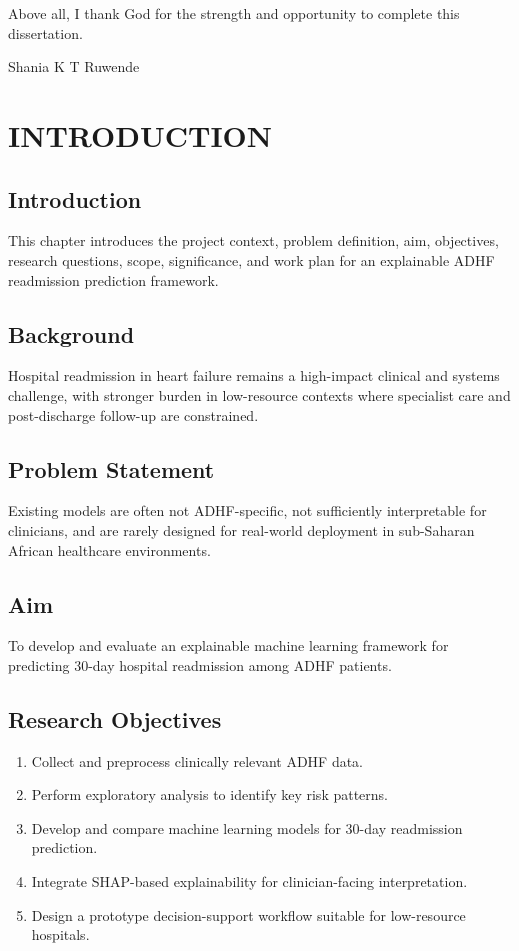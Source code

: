 \documentclass[12pt,a4paper]{report}
\begin{document}
Above all, I thank God for the strength and opportunity to complete this dissertation.

\vspace{2em}
Shania K T Ruwende

\tableofcontents
\clearpage


\chapter{INTRODUCTION}
\section{Introduction}
This chapter introduces the project context, problem definition, aim, objectives, research questions, scope, significance, and work plan for an explainable ADHF readmission prediction framework.

\section{Background}
Hospital readmission in heart failure remains a high-impact clinical and systems challenge, with stronger burden in low-resource contexts where specialist care and post-discharge follow-up are constrained.

\section{Problem Statement}
Existing models are often not ADHF-specific, not sufficiently interpretable for clinicians, and are rarely designed for real-world deployment in sub-Saharan African healthcare environments.

\section{Aim}
To develop and evaluate an explainable machine learning framework for predicting 30-day hospital readmission among ADHF patients.

\section{Research Objectives}
\begin{enumerate}
    \item Collect and preprocess clinically relevant ADHF data.
    \item Perform exploratory analysis to identify key risk patterns.
    \item Develop and compare machine learning models for 30-day readmission prediction.
    \item Integrate SHAP-based explainability for clinician-facing interpretation.
    \item Design a prototype decision-support workflow suitable for low-resource hospitals.
\end{enumerate}
\end{document}

